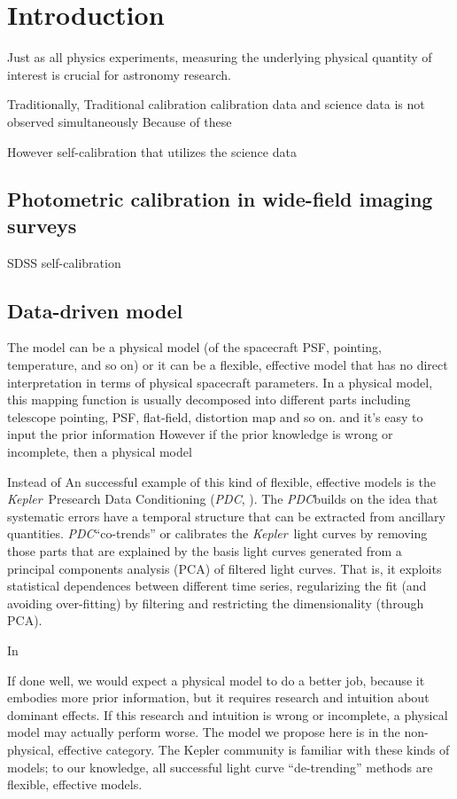 \documentclass[12pt, preprint]{aastex}
\newcommand{\project}[1]{\textsl{#1}}
\newcommand{\kepler}{\project{Kepler}}
\newcommand{\pdc}{\project{PDC}}
\begin{document}
\section{Introduction}
Just as all physics experiments, measuring the underlying physical quantity of interest is crucial for astronomy research.

Traditionally, 
Traditional calibration
calibration data and science data is not observed simultaneously
Because of these 

However self-calibration that utilizes the science data

\subsection{Photometric calibration in wide-field imaging surveys}
SDSS self-calibration 

\subsection{Data-driven model}
The model can be a physical model (of the spacecraft PSF, pointing, temperature, and so on) or it can be a flexible, effective model that has no direct interpretation in terms of physical spacecraft parameters.
In a physical model, this mapping function is usually decomposed into different parts including telescope pointing, PSF, flat-field, distortion map and so on.
 and it's easy to input the prior information 
However if the prior knowledge is wrong or incomplete, then a physical model 

Instead of 
An successful example of this kind of flexible, effective models is the \kepler\ Presearch Data Conditioning (\pdc, \citealt{pdc1}). 
The \pdc builds on the idea that systematic errors have a temporal structure that can be extracted from ancillary quantities.
\pdc ``co-trends'' or calibrates the \kepler\ light curves by removing those parts that are explained by the basis light curves generated from a principal components analysis (PCA) of filtered light curves.
That is, it exploits statistical dependences between different time series, regularizing the fit (and avoiding over-fitting) by filtering and restricting the dimensionality (through PCA).

In 

If done well, we would expect a physical model to do a better job, because it embodies more prior information, but it requires research and intuition about dominant effects. 
If this research and intuition is wrong or incomplete, a physical model may actually perform worse. The model we propose here is in the non-physical, effective category. The Kepler community is familiar with these kinds of models; to our knowledge, all successful light curve “de-trending” methods are flexible, effective models.
\end{document}
